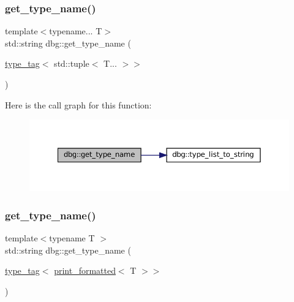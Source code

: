 \mbox{\label{namespacedbg_a1d187f8063d8c8c024e57a7985bcac78}} 
\subsubsection{\texorpdfstring{get\+\_\+type\+\_\+name()}{get\_type\_name()}\hspace{0.1cm}{\footnotesize\ttfamily [9/10]}}
{\footnotesize\ttfamily template$<$typename... T$>$ \\
std\+::string dbg\+::get\+\_\+type\+\_\+name (\begin{DoxyParamCaption}\item[{\hyperlink{structdbg_1_1type__tag}{type\+\_\+tag}$<$ std\+::tuple$<$ T... $>$$>$}]{ }\end{DoxyParamCaption})}

Here is the call graph for this function\+:
\nopagebreak
\begin{figure}[H]
\begin{center}
\leavevmode
\includegraphics[width=350pt]{namespacedbg_a1d187f8063d8c8c024e57a7985bcac78_cgraph}
\end{center}
\end{figure}
\mbox{\label{namespacedbg_a6224c816a1c695160e869f427854d569}} 
\subsubsection{\texorpdfstring{get\+\_\+type\+\_\+name()}{get\_type\_name()}\hspace{0.1cm}{\footnotesize\ttfamily [10/10]}}
{\footnotesize\ttfamily template$<$typename T $>$ \\
std\+::string dbg\+::get\+\_\+type\+\_\+name (\begin{DoxyParamCaption}\item[{\hyperlink{structdbg_1_1type__tag}{type\+\_\+tag}$<$ \hyperlink{structdbg_1_1print__formatted}{print\+\_\+formatted}$<$ T $>$$>$}]{ }\end{DoxyParamCaption})\hspace{0.3cm}{\ttfamily [inline]}}

